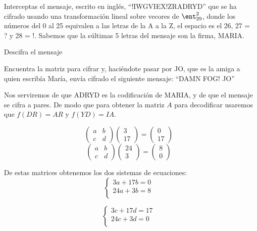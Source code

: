 \begin{problem}[3]
Interceptas el mensaje, escrito en inglés, ``!IWGVIEX!ZRADRYD'' que se ha cifrado usando una transformación lineal sobre vecores de $\ent_{29}^2$, donde los números del 0 al 25 equivalen a las letras de la A a la Z, el espacio es el 26, 27 = ? y 28 = !. Sabemos que la súltimas 5 letras del mensaje son la firma, MARIA.

\ppart Descifra el mensaje

\ppart Encuentra la matriz para cifrar y, haciéndote pasar por JO, que es la amiga a quien escribía María, envía cifrado el siguiente mensaje: ``DAMN FOG! JO''


\solution
{}


\spart
Nos serviremos de que ADRYD es la codificación de MARIA, y de que el mensaje se cifra a pares. De modo que para obtener la matriz $A$ para decodificar usaremos que $f(DR)=AR$ y $f(YD)=IA$.

\[ \left( \begin{array}{cc}
	a & b \\
	c & d
	\end{array} \right)
	\left( \begin{array}{cc}
	3 \\
	17
	\end{array} \right)
	=
	\left( \begin{array}{cc}
	0 \\
	17
	\end{array} \right)
\]
\[
	\left( \begin{array}{cc}
	a & b \\
	c & d
	\end{array} \right)
	\left( \begin{array}{cc}
	24 \\
	3
	\end{array} \right)
	=
	\left( \begin{array}{cc}
	8 \\
	0
	\end{array} \right)
\]

De estas matrices obtenemos los dos sistemas de ecuaciones:
\[
  \begin{cases}
    3a + 17b = 0\\
    24a + 3b = 8\\
  \end{cases}
\]

\[
  \begin{cases}
    3c + 17d = 17\\
    24c + 3d = 0\\
  \end{cases}
\]


\end{problem}
